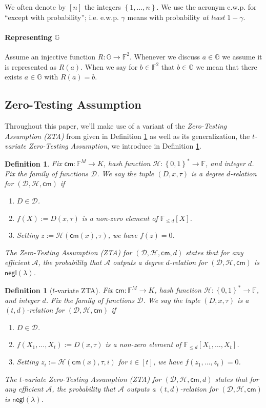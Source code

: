 \documentclass[11pt]{article} %
\newcommand{\G}{\ensuremath{{\mathbb G}}\xspace}
\newcommand{\F}{\ensuremath{\mathbb F}\xspace}
\newcommand{\adv}{\ensuremath{\mathcal A}\xspace}
\newcommand{\cm}{\ensuremath{\mathsf{cm}}\xspace}
\newcommand{\negl}{\ensuremath{\mathsf{negl}(\lambda)}\xspace}
\newcommand{\defeq}{:=}
\newcommand{\B}{\ensuremath{\set{0,1}}\xspace}
\newcommand{\hash}{\ensuremath{\mathcal{H}}\xspace}
\newcommand{\set}[1]{\ensuremath{\left\{#1\right\}}\xspace}
\newcommand{\polysofdegeq}[1]{\ensuremath{\F_{\leq #1}[X]}\xspace}
\newcommand{\obgen}{\ensuremath{\mathcal O}\xspace}
\newtheorem{dfn}[lemma]{Definition}
\newcommand{\ztafuncs}{\ensuremath{\mathcal{D}}\xspace}
\begin{document}
We often denote by $[n]$ the integers \set{1,\ldots,n}.
We use the acronym e.w.p. for ``except with probability''; i.e. e.w.p. $\gamma$ means with probability \emph{at least} $1-\gamma$.


\paragraph{Representing \G}
Assume an injective function $R:\G \to \F^2$.
Whenever we discuss $a\in \G$ we assume it is represented as  $R(a)$.
When we say for $b\in \F^2$ that $b\in \G$ we mean that there exists $a\in \G$ with $R(a)=b$.

\subsection{Zero-Testing Assumption}
Throughout this paper, we'll make use of a variant of the \emph{Zero-Testing Assumption (ZTA)} from \cite{novarecursive} given in Definition \ref{dfn:ZTA} as well as its generalization, the \emph{$t$-variate Zero-Testing Assumption}, we introduce in Definition \ref{dfn:multiZTA}.

\begin{dfn}\label{dfn:ZTA}
Fix $\cm:\F^M\to K$, hash function $\hash:\B^*\to \F$, and integer $d$. Fix the family of functions \ztafuncs. 
We say the tuple $(D,x,\tau)$ is a \emph{degree $d$-relation for $(\ztafuncs,\hash,\cm)$} if
\begin{enumerate}
 \item $D\in \ztafuncs$.
 \item $f(X)\defeq D(x,\tau)$ is a non-zero element of \polysofdegeq{d}.
 \item Setting $z\defeq \hash(\cm(x),\tau)$, we have $f(z)=0$.
\end{enumerate}
The Zero-Testing Assumption (ZTA) for $(\ztafuncs,\hash,\cm,d)$ states that for any efficient \adv, the probability that 
\adv outputs a degree $d$-relation for $(\ztafuncs,\hash,\cm)$ is \negl.
\end{dfn}

\begin{dfn}[$t$-variate ZTA]\label{dfn:multiZTA}
Fix $\cm:\F^M\to K$, hash function $\hash:\B^*\to \F$, and integer $d$. Fix the family of functions \ztafuncs.
We say the tuple $(D,x,\tau)$ is a \emph{$(t,d)$-relation for $(\ztafuncs,\hash,\cm)$} if
\begin{enumerate}
 \item $D\in \ztafuncs$.
 \item $f(X_1,\ldots,X_t)\defeq D(x,\tau)$ is a non-zero element of $\F_{\leq d}[X_1,\ldots,X_t]$.
 \item Setting $z_i\defeq \hash(\cm(x),\tau,i)$ for $i\in[t]$, we have $f(z_1,\ldots,z_t)=0$.
\end{enumerate}
The $t$-variate Zero-Testing Assumption (ZTA) for $(\ztafuncs,\hash,\cm,d)$ states that for any efficient \adv, the probability that
\adv outputs a $(t,d)$-relation for $(\ztafuncs,\hash,\cm)$ is \negl.
\end{dfn}
\end{document}
